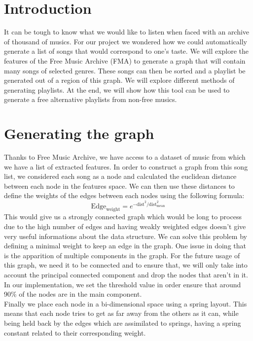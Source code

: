 \section{Introduction}

It can be tough to know what we would like to listen when faced with an archive of thousand of musics. For our project we wondered how we could automatically generate a list of songs that would correspond to one's taste. We will explore the features of the Free Music Archive (FMA) to generate a graph that will contain many songs of selected genres. These songs can then be sorted and a playlist be generated out of a region of this graph. We will explore different methods of generating playlists. At the end, 
we will show how this tool can be used to generate a free alternative playlists from non-free musics.

\section{Generating the graph}
Thanks to Free Music Archive, we have access to a dataset of music from which we have a list of extracted features. In order to construct a graph from this song list, we considered each song as a node and calculated the euclidean distance between each node in the features space. We can then use these distances to define the weights of the edges between each nodes using the following formula:
$$
\text{Edge}_{\text{weight}}=e^{-\text{dist}^2/\text{dist}_{\text{mean}}^2}
$$
This would give us a strongly connected graph which would be long to process due to the high number of edges and having weakly weighted edges doesn't give very useful informations about the data structure. We can solve this problem by defining a minimal weight to keep an edge in the graph. One issue in doing that is the apparition of multiple components in the graph. For the future usage of this graph, we need it to be connected and to ensure that, we will only take into account the principal connected component and drop the nodes that aren't in it. In our implementation, we set the threshold value in order ensure that around 90\% of the nodes are in the main component.\\

Finally we place each node in a bi-dimensional space using a spring layout. This means that each node tries to get as far away from the others as it can, while being held back by the edges which are assimilated to springs, having a spring constant related to their corresponding weight.\\

